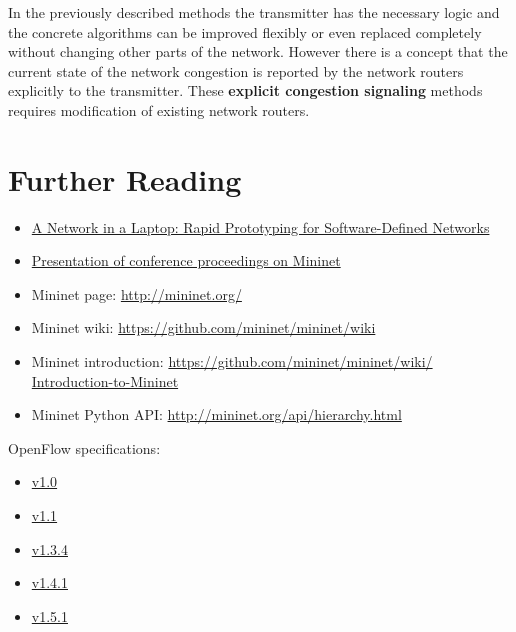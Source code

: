 \documentclass[a4paper]{article}
\begin{document}
In the previously described methods the transmitter has the necessary logic  and the concrete algorithms can be improved flexibly or even replaced completely without changing other parts of the network. However there is a concept that the current state of the network congestion is reported by the network routers explicitly to the transmitter. These \textbf{explicit congestion signaling} methods requires modification of existing network routers.


\section{Further Reading}

\begin{itemize}
    \item \href{https://qosip.tmit.bme.hu/foswiki/pub/Meres/OpenFlowMScMeresiSegedlet/a19-lantz.pdf}{A Network in a
              Laptop: Rapid Prototyping for Software-Defined Networks}
    \item

          \href{https://qosip.tmit.bme.hu/foswiki/pub/Meres/OpenFlowMScMeresiSegedlet/mininet-hotnets2010-final.pdf}{Presentation
              of conference proceedings on Mininet}
    \item	Mininet page: \url{http://mininet.org/}
    \item	Mininet wiki: \url{https://github.com/mininet/mininet/wiki}
    \item	Mininet introduction: \url{https://github.com/mininet/mininet/wiki/  Introduction-to-Mininet}
    \item	Mininet Python API: \url{http://mininet.org/api/hierarchy.html}
\end{itemize}

OpenFlow specifications:
\begin{itemize}
    \item
          \href{https://qosip.tmit.bme.hu/foswiki/pub/Meres/OpenFlowMScMeresiSegedlet/openflow-spec-v1.0.0.pdf}{v1.0}
    \item
          \href{https://qosip.tmit.bme.hu/foswiki/pub/Meres/OpenFlowMScMeresiSegedlet/openflow-spec-v1.1.0.pdf}{v1.1}
    \item

          \href{https://qosip.tmit.bme.hu/foswiki/pub/Meres/OpenFlowMScMeresiSegedlet/openflow-switch-v1.3.4.pdf}{v1.3.4}
    \item

          \href{https://qosip.tmit.bme.hu/foswiki/pub/Meres/OpenFlowMScMeresiSegedlet/openflow-switch-v1.4.1.pdf}{v1.4.1}
    \item

          \href{https://qosip.tmit.bme.hu/foswiki/pub/Meres/OpenFlowMScMeresiSegedlet/openflow-switch-v1.5.1.pdf}{v1.5.1}

\end{itemize}
\end{document}
